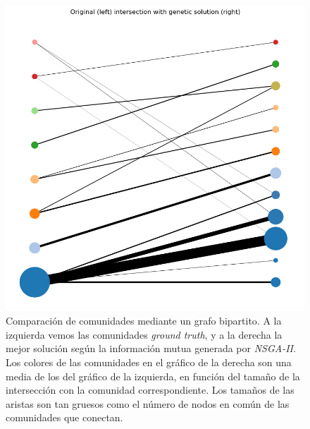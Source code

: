 \begin{figure}[!htb]
  \centering
  \includegraphics[width=.7\linewidth]{img/3_best_sol_bipartite_comp}
  \caption{Comparación de comunidades mediante un grafo bipartito. A la
    izquierda vemos las comunidades \emph{ground truth}, y a la derecha la
    mejor solución según la información mutua generada por \emph{NSGA-II}. Los
    colores de las comunidades en el gráfico de la derecha son una media de los
    del gráfico de la izquierda, en función del tamaño de la intersección con
    la comunidad correspondiente. Los tamaños de las aristas son tan gruesos
    como el número de nodos en común de las comunidades que conectan.}
  \label{fig:3-bipartite}
\end{figure}
